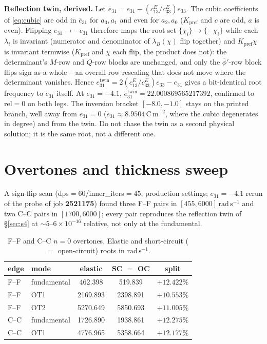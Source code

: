 \documentclass[11pt]{article}
\newcommand{\eebar}{\bar{e}_{31}}
\begin{document}
\textbf{Reflection twin, derived.} Let
$\eebar=e_{31}-(c_{13}^E/c_{33}^E)e_{33}$. The cubic coefficients of
\eqref{eq:cubic} are odd in $\eebar$ for $a_3,a_1$ and even for
$a_2,a_0$ ($K_{\mathrm{pref}}$ and $c$ are odd, $a$ is even). Flipping $\eebar\to-\eebar$ therefore maps the root set
$\{\chi_i\}\to\{-\chi_i\}$ while each $\lambda_i$ is invariant (numerator
and denominator of $\lambda_B(\chi)$ flip together) and
$K_{\mathrm{pref}}\chi$ is invariant termwise ($K_{\mathrm{pref}}$ and
$\chi$ each flip, the product does not): the determinant's $M$-row and
$Q$-row blocks are unchanged, and only the $\bar\phi'$-row block flips
sign as a whole -- an overall row rescaling that does not move where the
determinant vanishes. Hence
$e_{31}^{\mathrm{twin}}=2(c_{13}^E/c_{33}^E)e_{33}-e_{31}$ gives a
bit-identical root frequency to $e_{31}$ itself. At $e_{31}=-4.1$,
$e_{31}^{\mathrm{twin}}=22.000869565217392$, confirmed to rel$=0$ on
both legs. The inversion bracket $[-8.0,-1.0]$ stays on the printed
branch, well away from $\eebar=0$ ($e_{31}\approx8.9504\,\mathrm{C\,m^{-2}}$,
where the cubic degenerates in degree) and from the twin. Do not chase the twin as a
second physical solution; it is the same root, not a different one.

\section{Overtones and thickness sweep}
\label{sec:s5}
\begin{sloppypar}
A sign-flip scan (dps$=60$/inner\_iters$=45$, production settings;
$e_{31}=-4.1$ rerun of the probe of job \textbf{2521175}) found three F--F pairs in
$[455,6000]\,\mathrm{rad\,s^{-1}}$ and two C--C pairs in
$[1700,6000]$; every pair reproduces the reflection twin of
\S\ref{sec:s4} at $\sim5$--$6\times10^{-16}$ relative, not only at the
fundamental.
\end{sloppypar}

\begin{table}[ht]
\centering
\caption{F--F and C--C $n=0$ overtones. Elastic and short-circuit
($=$ open-circuit) roots in $\mathrm{rad\,s^{-1}}$.}
\label{tab:overtones}
\small
\begin{tabular}{@{}llccc@{}}
\toprule
edge & mode & elastic & SC $=$ OC & split \\
\midrule
F--F & fundamental & 462.398 & 519.839 & $+12.422\%$ \\
F--F & OT1 & 2169.893 & 2398.891 & $+10.553\%$ \\
F--F & OT2 & 5270.649 & 5850.693 & $+11.005\%$ \\
C--C & fundamental & 1726.890 & 1938.861 & $+12.275\%$ \\
C--C & OT1 & 4776.965 & 5358.664 & $+12.177\%$ \\
\bottomrule
\end{tabular}
\end{table}
\end{document}
